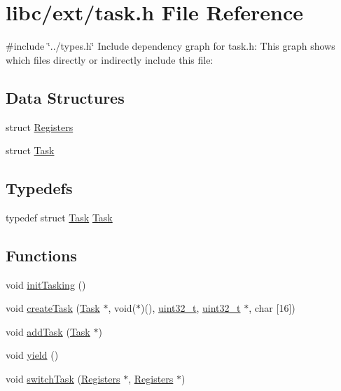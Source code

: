 \hypertarget{a00047}{}\section{libc/ext/task.h File Reference}
\label{a00047}
{\ttfamily \#include \char`\"{}../types.\+h\char`\"{}}\newline
Include dependency graph for task.\+h\+:
This graph shows which files directly or indirectly include this file\+:
\subsection*{Data Structures}
\begin{DoxyCompactItemize}
\item 
struct \hyperlink{a00130}{Registers}
\item 
struct \hyperlink{a00134}{Task}
\end{DoxyCompactItemize}
\subsection*{Typedefs}
\begin{DoxyCompactItemize}
\item 
typedef struct \hyperlink{a00134}{Task} \hyperlink{a00047_a7a90fbdcc84682f027affec67944111b_a7a90fbdcc84682f027affec67944111b}{Task}
\end{DoxyCompactItemize}
\subsection*{Functions}
\begin{DoxyCompactItemize}
\item 
void \hyperlink{a00047_aea945e91746a54801f4763ad264746b9_aea945e91746a54801f4763ad264746b9}{init\+Tasking} ()
\item 
void \hyperlink{a00047_a3abb1d0cc6fd9ea5a5b860f36bc81d6a_a3abb1d0cc6fd9ea5a5b860f36bc81d6a}{create\+Task} (\hyperlink{a00134}{Task} $\ast$, void($\ast$)(), \hyperlink{a00092_a435d1572bf3f880d55459d9805097f62_a435d1572bf3f880d55459d9805097f62}{uint32\+\_\+t}, \hyperlink{a00092_a435d1572bf3f880d55459d9805097f62_a435d1572bf3f880d55459d9805097f62}{uint32\+\_\+t} $\ast$, char \mbox{[}16\mbox{]})
\item 
void \hyperlink{a00047_a077ea59d35297d9fb3fa4675beefbd79_a077ea59d35297d9fb3fa4675beefbd79}{add\+Task} (\hyperlink{a00134}{Task} $\ast$)
\item 
void \hyperlink{a00047_a58c8b2ad0ea491a6642e5e1cbd358c89_a58c8b2ad0ea491a6642e5e1cbd358c89}{yield} ()
\item 
void \hyperlink{a00047_a2425ca34147fccde2d1503332d21c5bd_a2425ca34147fccde2d1503332d21c5bd}{switch\+Task} (\hyperlink{a00130}{Registers} $\ast$, \hyperlink{a00130}{Registers} $\ast$)
\end{DoxyCompactItemize}


